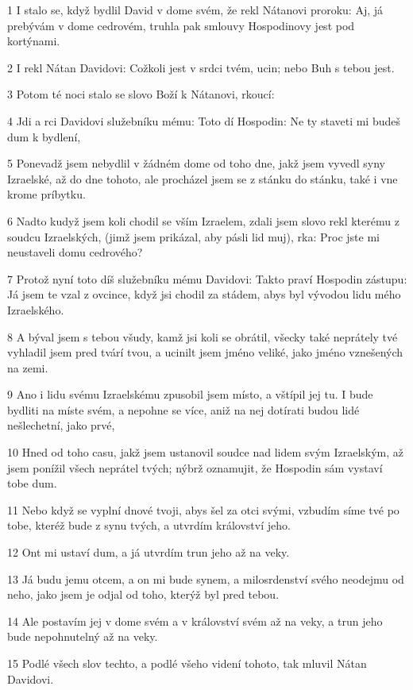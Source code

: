 \par 1 I stalo se, když bydlil David v dome svém, že rekl Nátanovi proroku: Aj, já prebývám v dome cedrovém, truhla pak smlouvy Hospodinovy jest pod kortýnami.
\par 2 I rekl Nátan Davidovi: Cožkoli jest v srdci tvém, ucin; nebo Buh s tebou jest.
\par 3 Potom té noci stalo se slovo Boží k Nátanovi, rkoucí:
\par 4 Jdi a rci Davidovi služebníku mému: Toto dí Hospodin: Ne ty staveti mi budeš dum k bydlení,
\par 5 Ponevadž jsem nebydlil v žádném dome od toho dne, jakž jsem vyvedl syny Izraelské, až do dne tohoto, ale procházel jsem se z stánku do stánku, také i vne krome príbytku.
\par 6 Nadto kudyž jsem koli chodil se vším Izraelem, zdali jsem slovo rekl kterému z soudcu Izraelských, (jimž jsem prikázal, aby pásli lid muj), rka: Proc jste mi neustaveli domu cedrového?
\par 7 Protož nyní toto díš služebníku mému Davidovi: Takto praví Hospodin zástupu: Já jsem te vzal z ovcince, když jsi chodil za stádem, abys byl vývodou lidu mého Izraelského.
\par 8 A býval jsem s tebou všudy, kamž jsi koli se obrátil, všecky také neprátely tvé vyhladil jsem pred tvárí tvou, a ucinilt jsem jméno veliké, jako jméno vznešených na zemi.
\par 9 Ano i lidu svému Izraelskému zpusobil jsem místo, a vštípil jej tu. I bude bydliti na míste svém, a nepohne se více, aniž na nej dotírati budou lidé nešlechetní, jako prvé,
\par 10 Hned od toho casu, jakž jsem ustanovil soudce nad lidem svým Izraelským, až jsem ponížil všech neprátel tvých; nýbrž oznamujit, že Hospodin sám vystaví tobe dum.
\par 11 Nebo když se vyplní dnové tvoji, abys šel za otci svými, vzbudím síme tvé po tobe, kteréž bude z synu tvých, a utvrdím království jeho.
\par 12 Ont mi ustaví dum, a já utvrdím trun jeho až na veky.
\par 13 Já budu jemu otcem, a on mi bude synem, a milosrdenství svého neodejmu od neho, jako jsem je odjal od toho, kterýž byl pred tebou.
\par 14 Ale postavím jej v dome svém a v království svém až na veky, a trun jeho bude nepohnutelný až na veky.
\par 15 Podlé všech slov techto, a podlé všeho videní tohoto, tak mluvil Nátan Davidovi.
